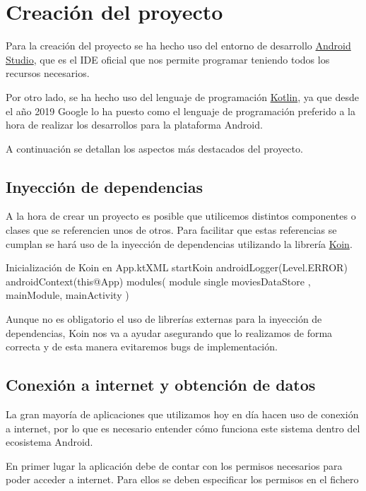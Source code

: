 \documentclass{\ClassPath/viu-tfm-template}
\begin{document}
\chapter{Creación del proyecto}

Para la creación del proyecto se ha hecho uso del entorno de desarrollo \href{https://developer.android.com/studio/}{Android Studio}, que es el IDE oficial que nos permite programar teniendo todos los recursos necesarios.

Por otro lado, se ha hecho uso del lenguaje de programación \href{https://kotlinlang.org/}{Kotlin}, ya que desde el año 2019 Google lo ha puesto como el lenguaje de programación preferido a la hora de realizar los desarrollos para la plataforma Android.

A continuación se detallan los aspectos más destacados del proyecto.

\section{Inyección de dependencias}
A la hora de crear un proyecto es posible que utilicemos distintos componentes o clases que se referencien unos de otros. Para facilitar que estas referencias se cumplan se hará uso de la inyección de dependencias utilizando la librería \href{https://insert-koin.io/}{Koin}.


\begin{mycode}{Inicialización de Koin en App.kt}{XML}{}
startKoin {
    androidLogger(Level.ERROR)
    androidContext(this@App)
    modules(
        module { single { moviesDataStore } },
        mainModule,
        mainActivity
    )
}
\end{mycode}

Aunque no es obligatorio el uso de librerías externas para la inyección de dependencias, Koin nos va a ayudar asegurando que lo realizamos de forma correcta y de esta manera evitaremos bugs de implementación.

\section{Conexión a internet y obtención de datos}
La gran mayoría de aplicaciones que utilizamos hoy en día hacen uso de conexión a internet, por lo que es necesario entender cómo funciona este sistema dentro del ecosistema Android.

En primer lugar la aplicación debe de contar con los permisos necesarios para poder acceder a internet. Para ellos se deben especificar los permisos en el fichero 
\end{document}
